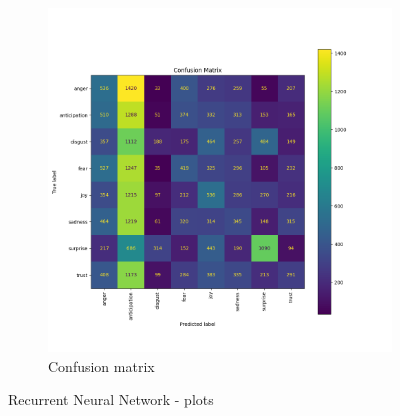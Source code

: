 \begin{figure}[H]
\begin{subfigure}{0.5\textwidth}
        \label{fig:rnn_classacc}
    \end{subfigure}
    \begin{subfigure}{0.6\textwidth}
        \includegraphics[width=\textwidth]{pictures/rnn_confusion_matrix.png}
        \caption{Confusion matrix}
        \label{fig:rnn_confmatr}
    \end{subfigure}
    \caption{Recurrent Neural Network - plots}
    \label{fig:rnn_performances}
\end{figure}



